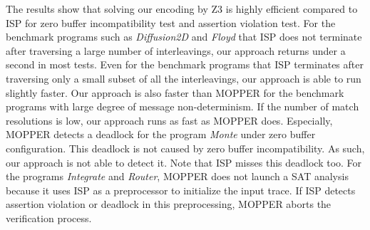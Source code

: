 The results show that solving our encoding by Z3 is highly efficient compared to ISP for zero buffer incompatibility test and assertion violation test. For the benchmark programs such as \textit{Diffusion2D} and \textit{Floyd} that ISP does not terminate after traversing a large number of interleavings, our approach returns under a second in most tests. Even for the benchmark programs that ISP terminates after traversing only a small subset of all the interleavings, our approach is able to run slightly faster. Our approach is also faster than MOPPER for the benchmark programs with large degree of message non-determinism. If the number of match resolutions is low, our approach runs as fast as MOPPER does. Especially, MOPPER detects a deadlock for the program \textit{Monte} under zero buffer configuration. This deadlock is not caused by zero buffer incompatibility. As such, our approach is not able to detect it. Note that ISP misses this deadlock too. For the programs \textit{Integrate} and \textit{Router}, MOPPER does not launch a SAT analysis because it uses ISP as a preprocessor to initialize the input trace. If ISP detects assertion violation or deadlock in this preprocessing, MOPPER aborts the verification process. 


